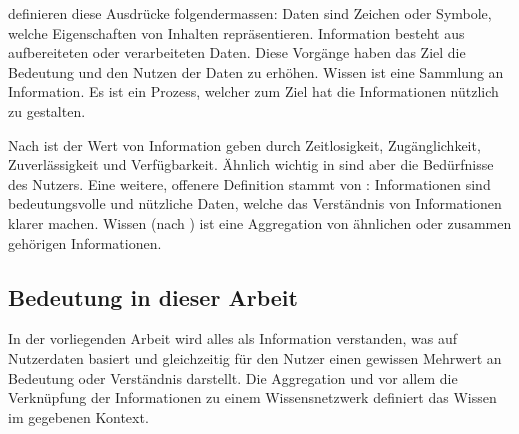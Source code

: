  \cite{bellinger2004data} definieren diese Ausdrücke folgendermassen:
 Daten sind Zeichen oder Symbole, welche Eigenschaften von Inhalten repräsentieren. Information besteht aus aufbereiteten oder verarbeiteten Daten. Diese Vorgänge haben das Ziel die Bedeutung und den Nutzen der Daten zu erhöhen. Wissen ist eine Sammlung an Information. Es ist ein Prozess, welcher zum Ziel hat die Informationen nützlich zu gestalten.
 
 Nach \cite{chen2005information} ist der Wert von Information geben durch Zeitlosigkeit, Zugänglichkeit, Zuverlässigkeit und Verfügbarkeit. Ähnlich wichtig in \cite{choo1996knowing} sind aber die Bedürfnisse des Nutzers. Eine weitere, offenere Definition stammt von \cite{bierly2000organizational}: Informationen sind bedeutungsvolle und nützliche Daten, welche das Verständnis von Informationen klarer machen. Wissen (nach \cite{barlas2005self}) ist eine Aggregation von ähnlichen oder zusammen gehörigen Informationen. 

\subsection{Bedeutung in dieser Arbeit}


In der vorliegenden Arbeit wird alles als Information verstanden, was auf Nutzerdaten basiert und gleichzeitig für den Nutzer einen gewissen Mehrwert an Bedeutung oder Verständnis darstellt. Die Aggregation und vor allem die Verknüpfung der Informationen zu einem Wissensnetzwerk definiert das Wissen im gegebenen Kontext.





